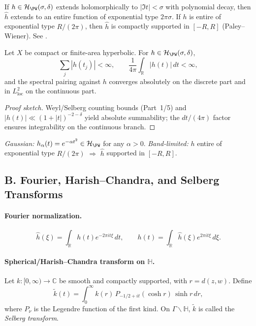 \begin{remark}
If $h\in\mathcal H_{\PW}(\sigma,\delta)$ extends holomorphically to $|\Im t|<\sigma$ with polynomial decay, then $\hat h$ extends to an entire function of exponential type $2\pi\sigma$. If $h$ is entire of exponential type $R/(2\pi)$, then $\hat h$ is compactly supported in $[-R,R]$ (Paley–Wiener). See \cite{PaleyWiener1934,HelgasonGGA}.
\end{remark}

\begin{lemma}
\label{lem:summability-sharp}
Let $X$ be compact or finite-area hyperbolic. For $h\in\mathcal H_{\PW}(\sigma,\delta)$,
\[
  \sum_j |h(t_j)|<\infty,
  \qquad
  \frac{1}{4\pi}\int_{\mathbb R}|h(t)|\,dt<\infty,
\]
and the spectral pairing against $h$ converges absolutely on the discrete part and in $L^2_{\mathrm{loc}}$ on the continuous part.
\end{lemma}

\begin{proof}[Proof sketch]
Weyl/Selberg counting bounds (Part~1/5) and $|h(t)|\ll(1+|t|)^{-2-\delta}$ yield absolute summability; the $dt/(4\pi)$ factor ensures integrability on the continuous branch.
\end{proof}

\begin{example}
\emph{Gaussian:} $h_\alpha(t)=e^{-\alpha t^2}\in\mathcal H_{\PW}$ for any $\alpha>0$.
\quad
\emph{Band-limited:} $h$ entire of exponential type $R/(2\pi)$ $\Rightarrow$ $\hat h$ supported in $[-R,R]$.
\end{example}


\subsection*{B. Fourier, Harish–Chandra, and Selberg Transforms}
\label{subsec:transforms-sharp}

\paragraph{Fourier normalization.}
\[
  \hat h(\xi)=\int_{\mathbb R} h(t)e^{-2\pi i t\xi}\,dt,
  \qquad
  h(t)=\int_{\mathbb R}\hat h(\xi)e^{2\pi i t\xi}\,d\xi.
\]

\paragraph{Spherical/Harish–Chandra transform on $\mathbb H$.}
Let $k:[0,\infty)\to\mathbb C$ be smooth and compactly supported, with $r=d(z,w)$. Define
\[
  \widetilde k(t)=\int_0^\infty k(r)\,P_{-1/2+it}(\cosh r)\,\sinh r\,dr,
\]
where $P_{\nu}$ is the Legendre function of the first kind. On $\Gamma\backslash\mathbb H$, $\widetilde k$ is called the \emph{Selberg transform}.

